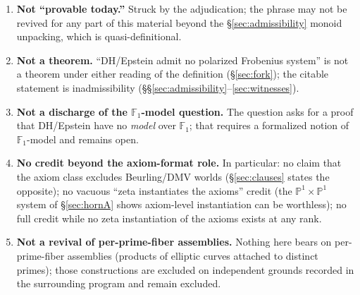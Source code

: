 \documentclass[11pt]{article}
\theoremstyle{plain}
\theoremstyle{definition}
\theoremstyle{remark}
\begin{document}
\begin{enumerate}
\item \textbf{Not ``provable today.''} Struck by the adjudication; the phrase
may not be revived for any part of this material beyond the
\S\ref{sec:admissibility} monoid unpacking, which is quasi-definitional.
\item \textbf{Not a theorem.} ``DH/Epstein admit no polarized Frobenius
system'' is not a theorem under either reading of the definition
(\S\ref{sec:fork}); the citable statement is inadmissibility
(\S\S\ref{sec:admissibility}--\ref{sec:witnesses}).
\item \sloppy \textbf{Not a discharge of the $\mathbb{F}_1$-model question.}
The question asks for a proof that DH/Epstein have no \emph{model} over
$\mathbb{F}_1$; that requires a formalized notion of $\mathbb{F}_1$-model and
remains open.
\item \textbf{No credit beyond the axiom-format role.} In particular: no claim
that the axiom class excludes Beurling/DMV worlds (\S\ref{sec:clauses} states
the opposite); no vacuous ``zeta instantiates the axioms'' credit (the
$\mathbb{P}^1 \times \mathbb{P}^1$ system of \S\ref{sec:hornA} shows
axiom-level instantiation can be worthless); no full credit while no zeta
instantiation of the axioms exists at any rank.
\item \textbf{Not a revival of per-prime-fiber assemblies.} Nothing here bears
on per-prime-fiber assemblies (products of elliptic curves attached to
distinct primes); those constructions are excluded on independent grounds
recorded in the surrounding program and remain excluded.
\end{enumerate}
\end{document}
